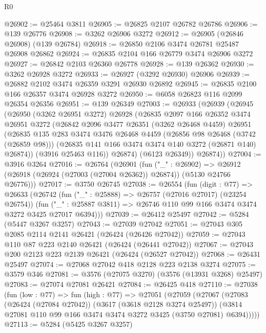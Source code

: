 \begin{lexlean}{R0}
\begin{coremodule}
@26902 := @25464 @3811
@26905 := @26825 @2107 @26782 @26786
@26906 := @139 @26776
@26908 := @3262 @26906 @3272
@26912 := @26905 (@26846 @26908) (@139 @26784)
@26918 := @26850 @2106 @3474 @26781 @25487 @26908 @26862
@26924 := @26835 @2104 @166 @26779 @3474 @26906 @3272
@26927 := @26842 @2103 @26360 @26778
@26928 := @139 @26362
@26930 := @3262 @26928 @3272
@26933 := @26927 (@3292 @26930) @26906
@26939 := @26882 @2102 @3474 @26359 @3291 @26930 @26892
@26945 := @26835 @2100 @166 @26357 @3474 @26928 @3272
@26950 := @6058 @26823 @116 @2099 @26354 @26356
@26951 := @139 @26349
@27003 := @26933
    (@26939
      (@26945
        (@26950
          (@3262 @26951 @3272)
          @26928
          (@26835
            @2097
            @166
            @26352
            @3474
            @26951
            @3272
            (@26842
              @2096
              @3477
              @26351
              (@3262 @26468 @4459)
              @26951
              (@26835
                @135
                @283
                @3474
                @3476
                @26468
                @4459
                (@26856 @98 @26468 (@3742 (@26859 @98)))
                (@26835 @141 @166 @3474 @3474 @140 @3272 (@26871 @140) @26874))
              (@3916 @25463 @116))
            @26874)
          (@6123 @26349))
        @26874))
@27004 := @3916 @3264
@27016 := @26764
    (@26901
      (fun ("_" : @26902) =>
      @26912 (@26918 (@26924 (@27003 (@27004 @26362)) @26874)) (@5130 @24766 @26776)))
@27017 := @3750 @26745
@27038 := @26554
    (fun (digit : @77) =>
    @26633
      (@26742
        (fun ("_" : @25888) => @26757 (@27016 @27017) (@23254 @26754))
        (fun ("_" : @25887 @3811) => @26746 @110 @99 @166 @3474 @3474 @3272 @3425 @27017 @6394)))
@27039 := @26412 @25497
@27042 := @5284 (@5447 @3267 @3257)
@27043 := @27039 @27042
@27051 := @27043 @305 @2085 @2114 @2141 @26421 (@26424 (@26426 @27042))
@27059 := @27043 @110 @87 @223 @2140 @26421 (@26424 (@26441 @27042))
@27067 := @27043 @200 @2123 @223 @2139 @26421 (@26424 (@26527 @27042))
@27068 := @26431 @25497
@27074 := @27068 @27042 @418 @2128 @223 @2138 @3274
@27075 := @3579 @346
@27081 := @3576 (@27075 @3270) (@3576 (@13931 @3268) @25497)
@27083 := @27074 @27081 @26421
@27084 := @26425 @418
@27110 := @27038
    (fun (low : @77) =>
    fun (high : @77) =>
    @27051
      (@27059
        (@27067
          (@27083
            (@26424 (@27084 @27042))
            (@3617 (@3618 @2128 @3274 @25497))
            (@3814 @27081 @110 @99 @166 @3474 @3474 @3272 @3425 (@3750 @27081) @6394)))))
@27113 := @5284 (@5425 @3267 @3257)

\end{coremodule}
\end{lexlean}

